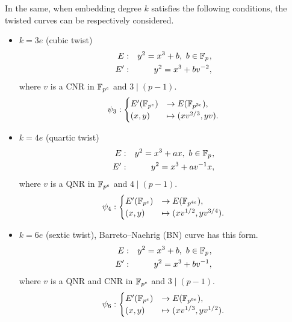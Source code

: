 In the same, when embedding degree $k$ satisfies the following conditions, the twisted curves can be respectively considered.
\begin{itemize}
	\item $k=3e$ (cubic twist) \\
	\begin{eqnarray*}
		E : && y^2=x^3+b,\ b\in {\mathbb{F}}_{p^{}}, \\
		E' : && y^2=x^3+bv^{-2},
	\end{eqnarray*}
	where $v$ is a CNR in ${\mathbb{F}}_{p^{e}}$ and $3\mid (p-1)$.
	\begin{eqnarray}
	\psi_3 : 
	\begin{cases}
	E'({\mathbb{F}}_{p^{e}}) & \rightarrow  E({\mathbb{F}}_{p^{3e}}), \\
	(x,y) & \mapsto (xv^{2/3},yv).
	\end{cases} \label{3t}
	\end{eqnarray}
	
	\item $k=4e$ (quartic twist) \\
	\begin{eqnarray*}
		E : && y^2=x^3+ax,\ b\in {\mathbb{F}}_{p^{}}, \\
		E' : && y^2=x^3+av^{-1}x,
	\end{eqnarray*}
	where $v$ is a QNR in ${\mathbb{F}}_{p^{e}}$ and \mbox{$4\mid (p-1)$}.
	\begin{eqnarray}
	\psi_4 : 
	\begin{cases}
	E'({\mathbb{F}}_{p^{e}}) & \rightarrow  E({\mathbb{F}}_{p^{4e}}), \\
	(x,y) & \mapsto (xv^{1/2},yv^{3/4}).
	\end{cases} \label{4t}
	\end{eqnarray}
	
	\item $k=6e$ (sextic twist), Barreto--Naehrig (BN) curve \cite{SAC:BarNae05} has this form. \\
	\begin{eqnarray*}
		E : && y^2=x^3+b,\ b\in {\mathbb{F}}_{p^{}}, \\
		E' : && y^2=x^3+bv^{-1},
	\end{eqnarray*}
	where $v$ is a QNR and CNR in ${\mathbb{F}}_{p^{e}}$ and {$3\mid (p-1)$}.
	\begin{eqnarray}
	\psi_6 : 
	\begin{cases}
	E'({\mathbb{F}}_{p^{e}}) & \rightarrow  E({\mathbb{F}}_{p^{6e}}), \\
	(x,y) & \mapsto (xv^{1/3},yv^{1/2}).
	\end{cases} \label{6t}
	\end{eqnarray}
\end{itemize}


